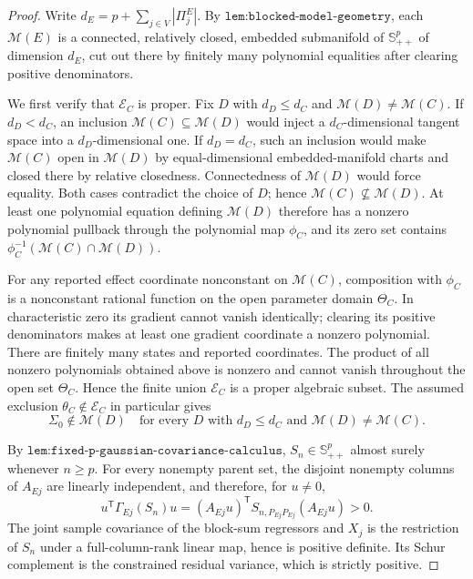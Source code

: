 \documentclass{article}
\begin{document}
\begin{proof}
Write \(d_E=p+\sum_{j\in V}|\Pi^E_j|\). By \(\texttt{lem:blocked-model-geometry}\), each \(\mathcal M(E)\) is a connected, relatively closed, embedded submanifold of \(\mathbb S^p_{++}\) of dimension \(d_E\), cut out there by finitely many polynomial equalities after clearing positive denominators.

We first verify that \(\mathcal E_C\) is proper. Fix \(D\) with \(d_D\leq d_C\) and \(\mathcal M(D)\neq\mathcal M(C)\). If \(d_D<d_C\), an inclusion \(\mathcal M(C)\subseteq\mathcal M(D)\) would inject a \(d_C\)-dimensional tangent space into a \(d_D\)-dimensional one. If \(d_D=d_C\), such an inclusion would make \(\mathcal M(C)\) open in \(\mathcal M(D)\) by equal-dimensional embedded-manifold charts and closed there by relative closedness. Connectedness of \(\mathcal M(D)\) would force equality. Both cases contradict the choice of \(D\); hence \(\mathcal M(C)\nsubseteq\mathcal M(D)\). At least one polynomial equation defining \(\mathcal M(D)\) therefore has a nonzero polynomial pullback through the polynomial map \(\phi_C\), and its zero set contains \(\phi_C^{-1}(\mathcal M(C)\cap\mathcal M(D))\).

For any reported effect coordinate nonconstant on \(\mathcal M(C)\), composition with \(\phi_C\) is a nonconstant rational function on the open parameter domain \(\Theta_C\). In characteristic zero its gradient cannot vanish identically; clearing its positive denominators makes at least one gradient coordinate a nonzero polynomial. There are finitely many states and reported coordinates. The product of all nonzero polynomials obtained above is nonzero and cannot vanish throughout the open set \(\Theta_C\). Hence the finite union \(\mathcal E_C\) is a proper algebraic subset. The assumed exclusion \(\theta_C\notin\mathcal E_C\) in particular gives
\[
 \Sigma_0\notin\mathcal M(D)
 \quad\text{for every }D\text{ with }d_D\leq d_C
 \text{ and }\mathcal M(D)\neq\mathcal M(C).
\]

By \(\texttt{lem:fixed-p-gaussian-covariance-calculus}\), \(S_n\in\mathbb S^p_{++}\) almost surely whenever \(n\geq p\). For every nonempty parent set, the disjoint nonempty columns of \(A_{Ej}\) are linearly independent, and therefore, for \(u\neq0\),
\[
 u^{\mathsf T}\Gamma_{Ej}(S_n)u
 =(A_{Ej}u)^{\mathsf T}S_{n,P_{Ej}P_{Ej}}(A_{Ej}u)>0.
\]
The joint sample covariance of the block-sum regressors and \(X_j\) is the restriction of \(S_n\) under a full-column-rank linear map, hence is positive definite. Its Schur complement is the constrained residual variance, which is strictly positive.


\end{proof}
\end{document}
